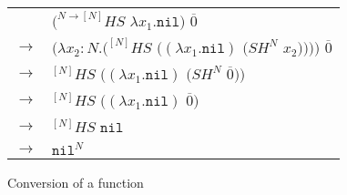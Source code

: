 \begin{figure}[tb]
\centering
\begin{tabular}{ll}
\vspace{5pt}

& $(^{N\rightarrow[N]}HS$ $\lambda x_{1}.\mathtt{nil})$ $\overline{0}$ \\

\vspace{5pt}

$\rightarrow$ & $(\lambda x_{2}:N.(^{[N]}HS$ $((\lambda x_{1}.\mathtt{nil})$ $(SH^{N}$ $x_{2}))))$ $\overline{0}$ \\

\vspace{5pt}

$\rightarrow$ & $^{[N]}HS$ $((\lambda x_{1}.\mathtt{nil})$ $(SH^{N}$ $\overline{0}))$ \\

\vspace{5pt}

$\rightarrow$ & $^{[N]}HS$ $((\lambda x_{1}.\mathtt{nil})$ $\overline{0})$ \\

\vspace{5pt}

$\rightarrow$ & $^{[N]}HS$ $\mathtt{nil}$ \\

\vspace{5pt}

$\rightarrow$ & $\mathtt{nil}^{N}$
\end{tabular}
\caption{Conversion of a function}
\label{function-1}
\end{figure}